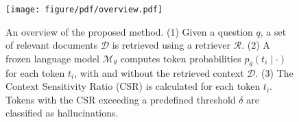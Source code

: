 \begin{figure}[t!]
    \centering
    \texttt{[image: figure/pdf/overview.pdf]}
    \caption {
        An overview of the proposed \textbf{\method} method.
        (1) Given a question $q$, a set of relevant documents $\mathcal{D}$ is retrieved using a retriever $\mathcal{R}$.
        (2) A frozen language model $\mathcal{M}_\theta$ computes token probabilities $p_{\theta}(t_i \mid \cdot )$ for each token $t_i$, with and without the retrieved context $\mathcal{D}$.
        (3) The Context Sensitivity Ratio (CSR) is calculated for each token $t_i$. Tokens with the CSR exceeding a predefined threshold $\delta$ are classified as hallucinations.
    } 
    \label{fig:overview}
\end{figure}